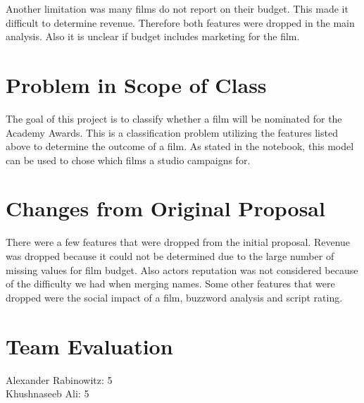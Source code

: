 \documentclass[]{report}
\begin{document}
Another limitation was many films do not report on their budget. This made it difficult to determine revenue. Therefore both features were dropped in the main analysis. Also it is unclear if budget includes marketing for the film. 

\section*{Problem in Scope of Class}

The goal of this project is to classify whether a film will be nominated for the Academy Awards. This is a classification problem utilizing the features listed above to determine the outcome of a film. As stated in the notebook, this model can be used to chose which films a studio campaigns for. 


\section*{Changes from Original Proposal}

There were a few features that were dropped from the initial proposal. Revenue was dropped because it could not be determined due to the large number of missing values for film budget. Also actors reputation was not considered because of the difficulty we had when merging names. Some other features that were dropped were the social impact of a film, buzzword analysis and script rating. 

\section*{Team Evaluation}

Alexander Rabinowitz: 5 \\
Khushnaseeb Ali: 5
\end{document}
